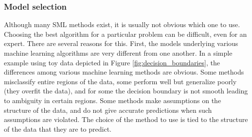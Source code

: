 

\subsubsection{Model selection}

Although many SML methods exist, it is usually not obvious which one to use. Choosing the best
algorithm for a particular problem can be difficult, even for an expert. There are several reasons
for this. First, the models underlying various machine learning algorithms are very different from
one another. In a simple example using toy data depicted in Figure \ref{fig:decision_boundaries}, the differences among 
various machine learning methods are obvious. Some methods misclassify entire regions of the data,
some perform well but generalize poorly (they overfit the data), and for some the decision boundary
is not smooth leading to ambiguity in certain regions.  Some methods make assumptions on the
structure of the data, and do not give accurate predictions when such assumptions are violated. The
choice of the method to use is tied to the structure of the data that they are to predict.

